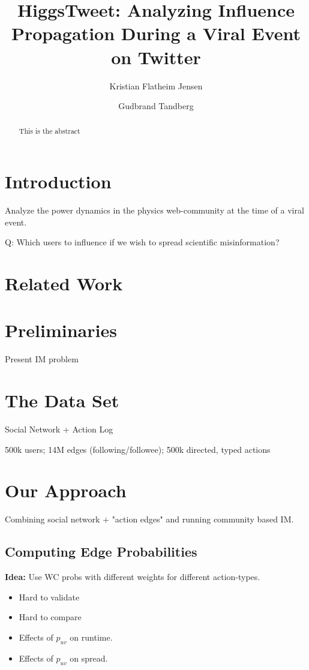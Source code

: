 \documentclass[sigconf]{acmart}
\title{HiggsTweet: Analyzing Influence Propagation During a Viral Event on Twitter}
\author{Kristian Flatheim Jensen}
\affiliation{%
\institution{Norwegian University of Science and Technology}
}
\author{Gudbrand Tandberg}
\affiliation{%
\institution{University of British Colombia}
}
\begin{document}
\maketitle

\begin{abstract}
This is the abstract
\end{abstract}

\section{Introduction}

Analyze the power dynamics in the physics web-community at the time of a viral event.

Q: Which users to influence if we wish to spread scientific misinformation? 

\section{Related Work}

\nocite{*}

\section{Preliminaries}

Present IM problem

\section{The Data Set}

Social Network + Action Log

500k users; 14M edges (following/followee); 500k directed, typed actions

\section{Our Approach}

Combining social network $+$ "action edges" and running community based IM. 

\subsection{Computing Edge Probabilities}

\textbf{Idea:} Use WC probs with different weights for different action-types. 

\begin{itemize}

\item Hard to validate

\item Hard to compare

\item Effects of $p_{uv}$ on runtime. 

\item Effects of $p_{uv}$ on spread. 

\end{itemize}
\end{document}

